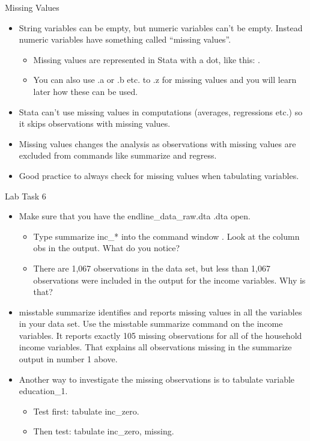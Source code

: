 \documentclass[aspectratio=169]{beamer}
\begin{document}
\begin{frame}{Missing Values}
\begin{itemize}
	\item String variables can be empty, but numeric variables can’t be empty. Instead numeric variables have something called “missing values”.
		\begin{itemize}
			\item 	Missing values are represented in Stata with a dot, like this: . 
			\item You can also use .a or .b etc. to .z for missing values and you will learn later how these can be used.
		\end{itemize}
	
	\item Stata can’t use missing values in computations (averages, regressions etc.) so it skips observations with missing values.  
	
	\item Missing values changes the analysis as observations with missing values are excluded from commands like summarize and regress.
	
	\item Good practice to always check for missing values when tabulating variables.
\end{itemize}
\end{frame}

\begin{frame}{Lab Task 6}
\begin{itemize}
	\item Make sure that you have the endline\_data\_raw.dta .dta open.
		\begin{itemize}
			\item Type summarize inc\_* into the command window . Look at the column obs in the output. What do you notice?
			\item There are  1,067 observations in the data set, but less than 1,067 observations were included in the output for the income variables. Why is that? 		
		\end{itemize}
	\item misstable summarize identifies and reports missing values in all the variables in your data set. Use the misstable summarize command on the income variables. It reports exactly 105 missing observations for all of the household income variables. That explains all observations missing in the summarize output in number 1 above.
	\item Another way to investigate the missing observations is to tabulate variable education\_1.
		\begin{itemize}
			\item Test first: tabulate inc\_zero.
			\item Then test: tabulate inc\_zero, missing.
		\end{itemize}	 
\end{itemize}
\end{frame}
\end{document}
